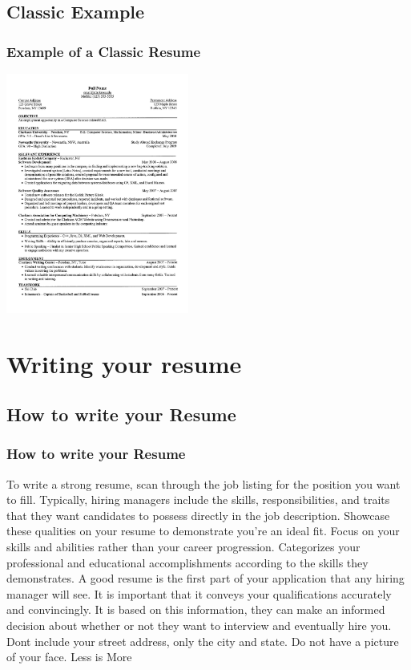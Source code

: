 \documentclass{beamer}
\begin{document}
\subsection{Classic Example}		
\begin{frame}
	\frametitle{Example of a Classic Resume}
	\vspace{-5pt}
	\begin{center}
		\includegraphics[width=0.45\textwidth]{images/Resume-Sample-7.jpg}
	\end{center}
\end{frame}

\section{Writing your resume}
	\subsection{How to write your Resume}
\begin{frame}
	\frametitle{How to write your Resume}
	\begin{outline}
		\1 To write a strong resume, scan through the job listing for the position you want to fill. 
		\2 Typically, hiring managers include the skills, responsibilities, and traits that they want candidates to possess directly in the job description. 
		\2 Showcase these qualities on your resume to demonstrate you’re an ideal fit.
		\1 Focus on your skills and abilities rather than your career progression.
		\2 Categorizes your professional and educational accomplishments according to the skills they demonstrates.
		\1 A good resume is the first part of your application that any hiring manager will see.
		\2 It is important that it conveys your qualifications accurately and convincingly.
		\2 It is based on this information, they can make an informed decision about whether or not they want to interview and eventually hire you.
		\1 Dont include your street address, only the city and state.
		\1 Do not have a picture of your face.
		\1 Less is More
	\end{outline}
\end{frame}
\end{document}
